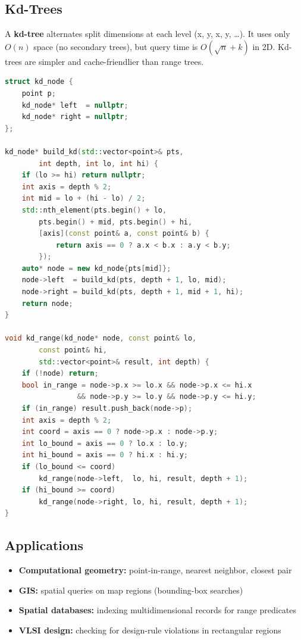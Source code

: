 \subsection{Kd-Trees}

A \textbf{kd-tree} alternates split dimensions at each level (x, y, x, y, \ldots). It uses only $O(n)$ space (no secondary trees), but query time is $O(\sqrt{n} + k)$ in 2D. Kd-trees are simpler and cache-friendlier than range trees.

\begin{lstlisting}[language=C++]
struct kd_node {
    point p;
    kd_node* left  = nullptr;
    kd_node* right = nullptr;
};

kd_node* build_kd(std::vector<point>& pts,
        int depth, int lo, int hi) {
    if (lo >= hi) return nullptr;
    int axis = depth % 2;
    int mid = lo + (hi - lo) / 2;
    std::nth_element(pts.begin() + lo,
        pts.begin() + mid, pts.begin() + hi,
        [axis](const point& a, const point& b) {
            return axis == 0 ? a.x < b.x : a.y < b.y;
        });
    auto* node = new kd_node{pts[mid]};
    node->left  = build_kd(pts, depth + 1, lo, mid);
    node->right = build_kd(pts, depth + 1, mid + 1, hi);
    return node;
}

void kd_range(kd_node* node, const point& lo,
        const point& hi,
        std::vector<point>& result, int depth) {
    if (!node) return;
    bool in_range = node->p.x >= lo.x && node->p.x <= hi.x
                 && node->p.y >= lo.y && node->p.y <= hi.y;
    if (in_range) result.push_back(node->p);
    int axis = depth % 2;
    int coord = axis == 0 ? node->p.x : node->p.y;
    int lo_bound = axis == 0 ? lo.x : lo.y;
    int hi_bound = axis == 0 ? hi.x : hi.y;
    if (lo_bound <= coord)
        kd_range(node->left,  lo, hi, result, depth + 1);
    if (hi_bound >= coord)
        kd_range(node->right, lo, hi, result, depth + 1);
}
\end{lstlisting}

\subsection{Applications}

\begin{itemize}
    \item \textbf{Computational geometry:} point-in-range, nearest neighbor, closest pair
    \item \textbf{GIS:} spatial queries on map regions (bounding-box searches)
    \item \textbf{Spatial databases:} indexing multidimensional records for range predicates
    \item \textbf{VLSI design:} checking for design-rule violations in rectangular regions
\end{itemize}


